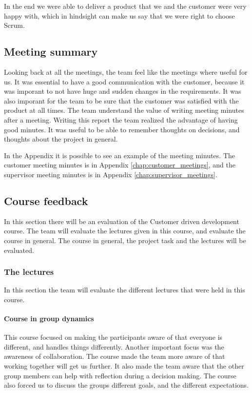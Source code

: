 In the end we were able to deliver a product that we and the customer were very happy with, which in hindsight can make us say that we were right to choose Scrum.

\subsection{Meeting summary}
Looking back at all the meetings, the team feel like the meetings where useful for us. It was essential to have a good communication with the customer, because it was imporant to not have huge and sudden changes in the requirements. It was also imporant for the team to be sure that the customer was satisfied with the product at all times. The team understand the value of writing meeting minutes after a meeting. Writing this report the team realized the advantage of having good minutes. It was useful to be able to remember thoughts on decisions, and thoughts about the project in general.

In the Appendix it is possible to see an example of the meeting minutes. The customer meeting minutes is in Appendix \ref{chap:customer_meetings}, and the supervisor meeting minutes is in Appendix \ref{chap:supervisor_meetings}. 
\subsection{Course feedback}
In this section there will be an evaluation of the Customer driven development course. The team will evaluate the lectures given in this course, and evaluate the course in general.
The course in general, the project task and the lectures will be evaluated.

\subsubsection{The lectures}
In this section the team will evaluate the different lectures that were held in this course.

\paragraph{Course in group dynamics}
This course focused on making the participants aware of that everyone is different, and handles things differently. Another important focus was the awareness of collaboration. The course made the team more aware of that working together will get us further. It also made the team aware that the other group members can help with reflection during a decision making. The course also forced us to discuss the groups different goals, and the different expectations. 

